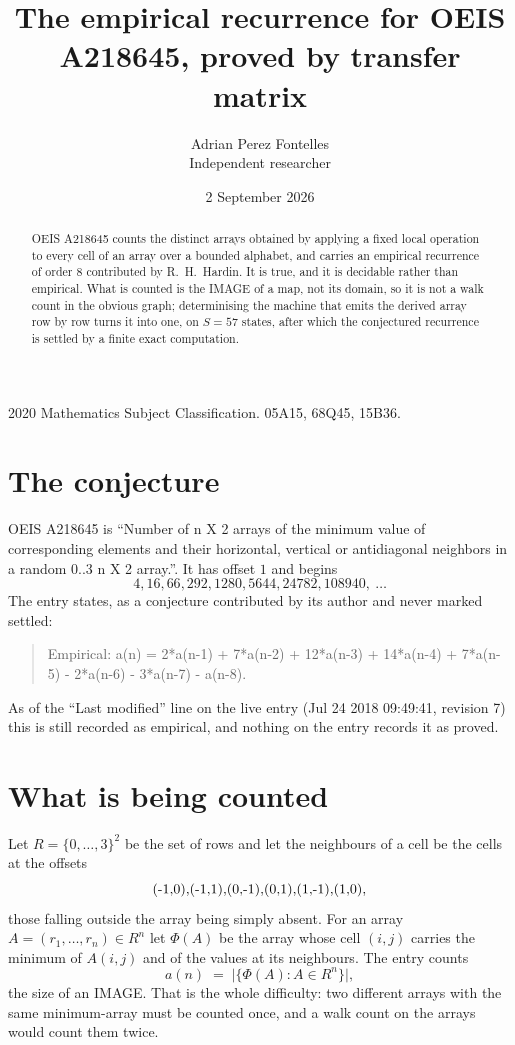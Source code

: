 \documentclass[11pt,a4paper]{article}
\title{The empirical recurrence for OEIS A218645, proved by transfer matrix}
\author{Adrian Perez Fontelles\\ \small Independent researcher}
\date{2 September 2026}
\theoremstyle{plain}
\theoremstyle{definition}
\begin{document}
\maketitle

\begin{abstract}
OEIS A218645 counts the distinct arrays obtained by applying a fixed local operation to every cell
of an array over a bounded alphabet, and carries an empirical recurrence of order $8$
contributed by R.~H.~Hardin. It is true, and it is decidable rather than empirical. What is
counted is the IMAGE of a map, not its domain, so it is not a walk count in the obvious graph;
determinising the machine that emits the derived array row by row turns it into one, on
$S=57$ states, after which the conjectured recurrence is settled by a finite exact
computation.
\end{abstract}

\noindent\small 2020 Mathematics Subject Classification. 05A15, 68Q45, 15B36.\normalsize

\section{The conjecture}

OEIS A218645 is ``Number of n X 2 arrays of the minimum value of corresponding elements and their horizontal, vertical or antidiagonal neighbors in a random 0..3 n X 2 array.''. It has offset $1$ and begins
\[
4, 16, 66, 292, 1280, 5644, 24782, 108940,\ \dots
\]
The entry states, as a conjecture contributed by its author and never marked settled:
\begin{quote}
Empirical: a(n) = 2*a(n-1) + 7*a(n-2) + 12*a(n-3) + 14*a(n-4) + 7*a(n-5) - 2*a(n-6) - 3*a(n-7) - a(n-8).
\end{quote}
As of the ``Last modified'' line on the live entry (Jul 24 2018 09:49:41, revision 7) this is still
recorded as empirical, and nothing on the entry records it as proved.

\section{What is being counted}

Let $R=\{0,\dots,3\}^{2}$ be the set of rows and let the neighbours of
a cell be the cells at the offsets
\[
$(-1,0)$, $(-1,1)$, $(0,-1)$, $(0,1)$, $(1,-1)$, $(1,0)$,
\]
those falling outside the array being simply absent. For an array
$A=(r_1,\dots,r_n)\in R^n$ let $\Phi(A)$ be the array whose cell $(i,j)$ carries the
minimum of $A(i,j)$ and of the values at its neighbours. The entry counts
\[
a(n)\;=\;\bigl|\{\Phi(A):A\in R^n\}\bigr| ,
\]
the size of an IMAGE. That is the whole difficulty: two different arrays with the same
minimum-array must be counted once, and a walk count on the arrays would count them twice.
\end{document}

